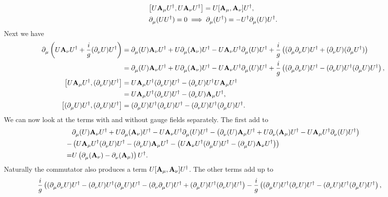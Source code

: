 \begin{align*}
	&\comm{U\textbf{A}_{\mu}U\adj}{U\textbf{A}_{\nu}U\adj} = U\comm{\textbf{A}_{\mu}}{\textbf{A}_{\nu}}U\adj, \\
	&\del{}{\mu}(UU\adj) = 0 \implies \del{}{\mu}(U\adj) = -U\adj\del{}{\mu}(U)U\adj.
\end{align*}
Next we have
\begin{align*}
	\del{}{\mu}\left(U\textbf{A}_{\nu}U\adj + \frac{i}{g}(\del{}{\nu}U)U\adj\right) &= \del{}{\mu}(U)\textbf{A}_{\nu}U\adj + U\del{}{\mu}(\textbf{A}_{\nu})U\adj - U\textbf{A}_{\nu}U\adj\del{}{\mu}(U)U\adj + \frac{i}{g}\left((\del{}{\mu}\del{}{\nu}U)U\adj + (\del{}{\nu}U)(\del{}{\mu}U\adj)\right) \\
	&= \del{}{\mu}(U)\textbf{A}_{\nu}U\adj + U\del{}{\mu}(\textbf{A}_{\nu})U\adj - U\textbf{A}_{\nu}U\adj\del{}{\mu}(U)U\adj + \frac{i}{g}\left((\del{}{\mu}\del{}{\nu}U)U\adj - (\del{}{\nu}U)U\adj(\del{}{\mu}U)U\adj\right), \\
	\comm{U\textbf{A}_{\mu}U\adj}{(\del{}{\nu}U)U\adj} &= U\textbf{A}_{\mu}U\adj(\del{}{\nu}U)U\adj - (\del{}{\nu}U)U\adj U\textbf{A}_{\mu}U\adj \\
	&= U\textbf{A}_{\mu}U\adj(\del{}{\nu}U)U\adj - (\del{}{\nu}U)\textbf{A}_{\mu}U\adj, \\
	\comm{(\del{}{\mu}U)U\adj}{(\del{}{\nu}U)U\adj} &= (\del{}{\mu}U)U\adj(\del{}{\nu}U)U\adj - (\del{}{\nu}U)U\adj(\del{}{\mu}U)U\adj.
\end{align*}
We can now look at the terms with and without gauge fields separately. The first add to
\begin{align*}
	 &\partial^{}_{\mu}(U)\textbf{A}_{\nu}U^{\dagger} + U\partial^{}_{\mu}(\textbf{A}_{\nu})U^{\dagger} - U\textbf{A}_{\nu}U^{\dagger}\partial^{}_{\mu}(U)U^{\dagger} - \left(\partial^{}_{\nu}(U)\textbf{A}_{\mu}U^{\dagger} + U\partial^{}_{\nu}(\textbf{A}_{\mu})U^{\dagger} - U\textbf{A}_{\mu}U^{\dagger}\partial^{}_{\nu}(U)U^{\dagger}\right) \\
	-& \left(U\textbf{A}_{\mu}U^{\dagger}(\partial^{}_{\nu}U)U^{\dagger} - (\partial^{}_{\nu}U)\textbf{A}_{\mu}U^{\dagger} - \left(U\textbf{A}_{\nu}U^{\dagger}(\partial^{}_{\mu}U)U^{\dagger} - (\partial^{}_{\mu}U)\textbf{A}_{\nu}U^{\dagger}\right)\right) \\
	=& U\left(\partial^{}_{\mu}(\textbf{A}_{\nu}) - \partial^{}_{\nu}(\textbf{A}_{\mu})\right)U^{\dagger}.
\end{align*}
Naturally the commutator also produces a term $U\comm{\textbf{A}_{\mu}}{\textbf{A}_{\nu}}U\adj$. The other terms add up to 
\begin{align*}
	&\frac{i}{g}\left((\partial^{}_{\mu}\partial^{}_{\nu}U)U^{\dagger} - (\partial^{}_{\nu}U)U^{\dagger}(\partial^{}_{\mu}U)U^{\dagger} - (\partial^{}_{\nu}\partial^{}_{\mu}U)U^{\dagger} + (\partial^{}_{\mu}U)U^{\dagger}(\partial^{}_{\nu}U)U^{\dagger}\right) - \frac{i}{g}\left((\partial^{}_{\mu}U)U^{\dagger}(\partial^{}_{\nu}U)U^{\dagger} - (\partial^{}_{\nu}U)U^{\dagger}(\partial^{}_{\mu}U)U^{\dagger}\right),
\end{align*}
